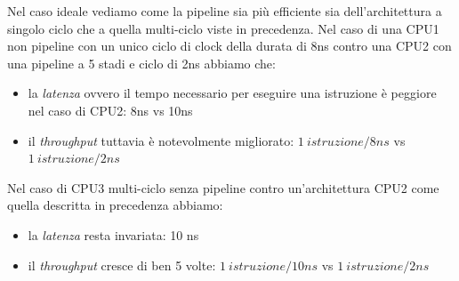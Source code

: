 Nel caso ideale vediamo come la pipeline sia più efficiente sia dell'architettura a singolo ciclo che a quella multi-ciclo viste in precedenza.
Nel caso di una CPU1 non pipeline con un unico ciclo di clock della durata di 8ns contro una CPU2 con una pipeline a 5 stadi e ciclo di 2ns abbiamo che:
\begin{itemize}
\item la \emph{latenza} ovvero il tempo necessario per eseguire una istruzione è peggiore nel caso di CPU2: 8ns vs 10ns
\item il \emph{throughput} tuttavia è notevolmente migliorato: $1 \ istruzione/8ns$ vs $1 \ istruzione/2ns$
\end{itemize}
Nel caso di CPU3 multi-ciclo senza pipeline contro un'architettura CPU2 come quella descritta in precedenza abbiamo:
\begin{itemize}
\item la \emph{latenza} resta invariata: 10 ns
\item il \emph{throughput} cresce di ben 5 volte: $1 \ istruzione/10ns$ vs $1 \ istruzione/2ns$
\end{itemize}
